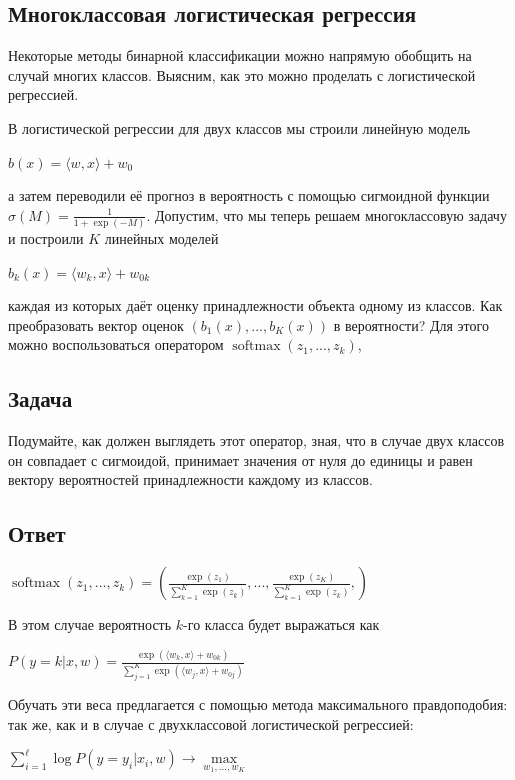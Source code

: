\begin{itemize}
\subsection{Многоклассовая логистическая регрессия}

Некоторые методы бинарной классификации можно напрямую обобщить на случай многих классов. Выясним, как это можно проделать с логистической регрессией.

В логистической регрессии для двух классов мы строили линейную модель

$b(x) = \langle w, x \rangle+w_0$

а затем переводили её прогноз в вероятность с помощью сигмоидной функции $\sigma(M) = \frac{1}{1+\operatorname{exp}(-M)}$. Допустим, что мы теперь решаем многоклассовую задачу и построили $K$ линейных моделей

$b_k(x) = \langle w_k, x \rangle+w_{0k}$

каждая из которых даёт оценку принадлежности объекта одному из классов. Как преобразовать вектор оценок $(b_1(x),...,b_K(x))$ в вероятности? Для этого можно воспользоваться оператором $\operatorname{softmax}(z_1,...,z_k)$,

\subsection*{Задача}

Подумайте, как должен выглядеть этот оператор, зная, что в случае двух классов он совпадает с сигмоидой, принимает значения от нуля до единицы и равен вектору вероятностей принадлежности каждому из классов.

\subsection*{Ответ}

$\operatorname{softmax}(z_1,...,z_k) = \left( \frac{\exp{(z_1)}}{\sum^K_{k=1}\exp{(z_k)}}, ..., \frac{\exp{(z_K)}}{\sum^K_{k=1}\exp{(z_k)}}, \right)$ \newline

В этом случае вероятность $k$-го класса будет выражаться как

$P(y=k|x,w) = \frac{\exp{(\langle w_k, x \rangle+w_{0k})}}{\sum^K_{j=1}\exp{(\langle w_j, x \rangle+w_{0j})}}$

Обучать эти веса предлагается с помощью метода максимального правдоподобия: так же, как и в случае с двухклассовой логистической регрессией:

$\sum\limits_{i=1}^\ell \log P(y=y_i|x_i,w) \xrightarrow{} \max\limits_{w_1,...,w_K}$


\end{itemize}

